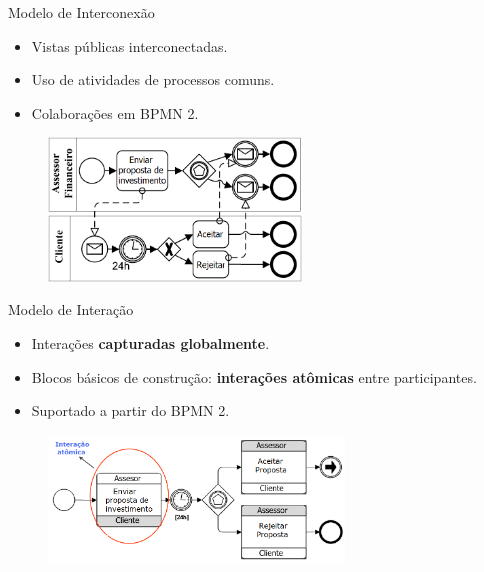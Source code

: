 \documentclass[xcolor=svgnames]{beamer}
\begin{document}
  \begin{frame}{Modelo de Interconexão }
      \begin{itemize}
	\item Vistas públicas interconectadas.	
	\item Uso de atividades de processos comuns.
 	\item Colaborações em BPMN 2.
      \end{itemize}
   \begin{figure}[!h]
	    \centering
	    \includegraphics[width=0.6\textwidth]{figures/interconnection_choreography-pt.png}
    \end{figure}	
  \end{frame}

  \begin{frame}{ Modelo de Interação}
    \begin{itemize}
	  \item Interações \textbf{capturadas globalmente}.	
	  \item Blocos básicos de construção: \textbf{interações atômicas} entre participantes.
	  \item Suportado a partir do BPMN 2.
	\end{itemize}
    \begin{figure}[!h]
	      \centering
	      \includegraphics[width=0.7\textwidth]{figures/interaction_choreography2-br.png}
      \end{figure}	
  \end{frame}


\end{document}
